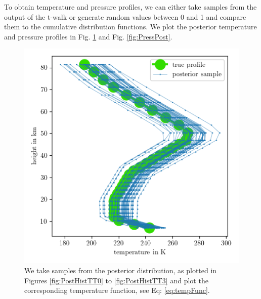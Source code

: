 \clearpage
To obtain temperature and pressure profiles, we can either take samples from the output of the t-walk or generate random values between 0 and 1 and compare them to the cumulative distribution functions.
We plot the posterior temperature and pressure profiles in Fig. \ref{fig:TempPost} and Fig. \ref{fig:PressPost}.
\begin{figure}[ht!]
	\centering
	\includegraphics{TempPostMeanSigm.png} 
	\caption[Temperature posterior samples.]{We take samples from the posterior distribution, as plotted in Figures \ref{fig:PostHistTT0} to \ref{fig:PostHistTT3} and plot the corresponding temperature function, see Eq: \ref{eq:tempFunc}. }
	\label{fig:TempPost}
\end{figure}
\cleardoublepage
